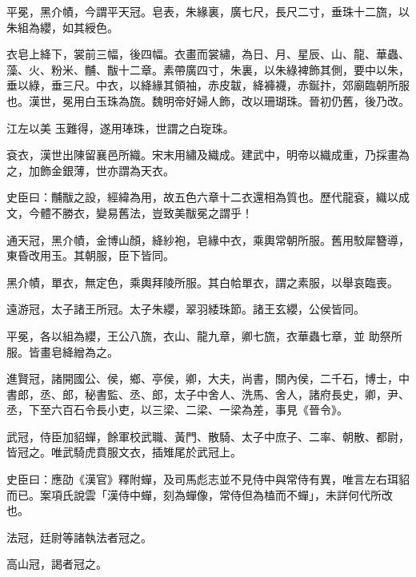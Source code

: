 \begin{pinyinscope}
 平冕，黑介幘，今謂平天冠。皂表，朱緣裏，廣七尺，長尺二寸，垂珠十二旒，以朱組為纓，如其綬色。



 衣皂上絳下，裳前三幅，後四幅。衣畫而裳繡，為日、月、星辰、山、龍、華蟲、藻、火、粉米、黼、黻十二章。素帶廣四寸，朱裏，以朱綠裨飾其側，要中以朱，垂以綠，垂三尺。中衣，以絳緣其領袖，赤皮韍，絳褲襪，赤鋋抃，郊廟臨朝所服也。漢世，冕用白玉珠為旒。魏明帝好婦人飾，改以珊瑚珠。晉初仍舊，後乃改。



 江左以美
 玉難得，遂用琫珠，世謂之白琁珠。



 袞衣，漢世出陳留襄邑所織。宋末用繡及織成。建武中，明帝以織成重，乃採畫為之，加飾金銀薄，世亦謂為天衣。



 史臣曰：黼黻之設，經緯為用，故五色六章十二衣還相為質也。歷代龍袞，織以成文，今體不勝衣，變易舊法，豈致美黻冕之謂乎！



 通天冠，黑介幘，金博山顏，絳紗袍，皂緣中衣，乘輿常朝所服。舊用駮犀簪導，東昏改用玉。其朝服，臣下皆同。



 黑介幘，單衣，無定色，乘輿拜陵所服。其白帢單衣，謂之素服，以舉哀臨喪。



 遠游冠，太子諸王所冠。太子朱纓，翠羽緌珠節。諸王玄纓，公侯皆同。



 平冕，各以組為纓，王公八旒，衣山、龍九章，卿七旒，衣華蟲七章，並
 助祭所服。皆畫皂絳繒為之。



 進賢冠，諸開國公、侯，鄉、亭侯，卿，大夫，尚書，關內侯，二千石，博士，中書郎，丞、郎，秘書監、丞、郎，太子中舍人、洗馬、舍人，諸府長史，卿，尹、丞，下至六百石令長小吏，以三梁、二梁、一梁為差，事見《晉令》。



 武冠，侍臣加貂蟬，餘軍校武職、黃門、散騎、太子中庶子、二率、朝散、都尉，皆冠之。唯武騎虎賁服文衣，插雉尾於武冠上。



 史臣曰：應劭《漢官》釋附蟬，及司馬彪志並不見侍中與常侍有異，唯言左右珥貂而已。案項氏說雲「漢侍中蟬，刻為蟬像，常侍但為榼而不蟬」，未詳何代所改也。



 法冠，廷尉等諸執法者冠之。



 高山冠，謁者冠之。




\end{pinyinscope}
